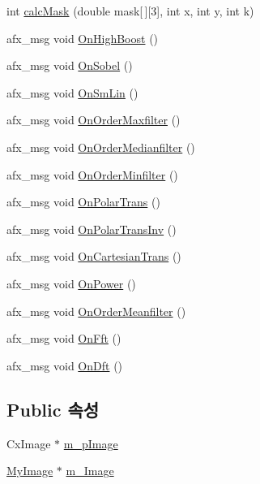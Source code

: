 \begin{DoxyCompactItemize}
\item 
int \hyperlink{class_c_my_image_processing_doc_a541cb66c2473454a49be669acaa0db67}{calc\-Mask} (double mask\mbox{[}$\,$\mbox{]}\mbox{[}3\mbox{]}, int x, int y, int k)
\item 
afx\-\_\-msg void \hyperlink{class_c_my_image_processing_doc_a02adaf0fa2601aa7257403f3add15d45}{On\-High\-Boost} ()
\item 
afx\-\_\-msg void \hyperlink{class_c_my_image_processing_doc_ae1eb87303d441fee44eee9cc0713f35e}{On\-Sobel} ()
\item 
afx\-\_\-msg void \hyperlink{class_c_my_image_processing_doc_a81bf8bfe13998034c311facb4480b72a}{On\-Sm\-Lin} ()
\item 
afx\-\_\-msg void \hyperlink{class_c_my_image_processing_doc_ae19b8ec98c48bb0092cd6d49a4365870}{On\-Order\-Maxfilter} ()
\item 
afx\-\_\-msg void \hyperlink{class_c_my_image_processing_doc_a179bd964abd852b3276b536e6d1cbfaa}{On\-Order\-Medianfilter} ()
\item 
afx\-\_\-msg void \hyperlink{class_c_my_image_processing_doc_a086368f43f1bdca128134b4397942516}{On\-Order\-Minfilter} ()
\item 
afx\-\_\-msg void \hyperlink{class_c_my_image_processing_doc_afdc7a9e36d9ec2d9f600737ed67a31d7}{On\-Polar\-Trans} ()
\item 
afx\-\_\-msg void \hyperlink{class_c_my_image_processing_doc_a2ce4f7dce9e33b9bb7baf5cfc908b516}{On\-Polar\-Trans\-Inv} ()
\item 
afx\-\_\-msg void \hyperlink{class_c_my_image_processing_doc_a7798d32dd4e007b2f92a4cfd17863660}{On\-Cartesian\-Trans} ()
\item 
afx\-\_\-msg void \hyperlink{class_c_my_image_processing_doc_a59e47774204f909d57cbb86b12a2d0ab}{On\-Power} ()
\item 
afx\-\_\-msg void \hyperlink{class_c_my_image_processing_doc_acc6818171d5d567884143cdd10a5cb25}{On\-Order\-Meanfilter} ()
\item 
afx\-\_\-msg void \hyperlink{class_c_my_image_processing_doc_a739a32984fd9a5c759cf940772b092ac}{On\-Fft} ()
\item 
afx\-\_\-msg void \hyperlink{class_c_my_image_processing_doc_a4663dab53118f156bca90aaefa2f6058}{On\-Dft} ()
\end{DoxyCompactItemize}
\subsection*{Public 속성}
\begin{DoxyCompactItemize}
\item 
Cx\-Image $\ast$ \hyperlink{class_c_my_image_processing_doc_ad5fdd82c16f80240fb27e6f3a04a333b}{m\-\_\-p\-Image}
\item 
\hyperlink{class_my_image}{My\-Image} $\ast$ \hyperlink{class_c_my_image_processing_doc_a4f70944ed5cc5c772165aec9a9e88c69}{m\-\_\-\-Image}
\end{DoxyCompactItemize}
